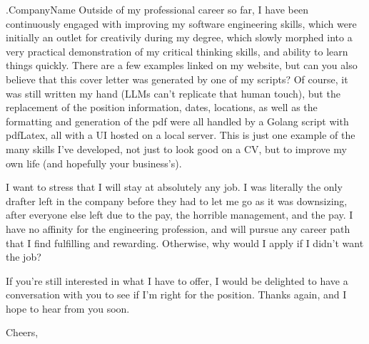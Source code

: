 \documentclass[10pt]{letter}
\begin{document}
\begin{letter}{
    {{ .CompanyName }}
}
Outside of my professional career so far, I have been continuously engaged with improving my software engineering skills, which were initially an outlet for creativily during my degree, which slowly morphed into a very practical demonstration of my critical thinking skills, and ability to learn things quickly. There are a few examples linked on my website, but can you also believe that this cover letter was generated by one of my scripts? Of course, it was still written my hand (LLMs can't replicate that human touch), but the replacement of the position information, dates, locations, as well as the formatting and generation of the pdf were all handled by a Golang script with pdfLatex, all with a UI hosted on a local server. This is just one example of the many skills I've developed, not just to look good on a CV, but to improve my own life (and hopefully your business's). 

I want to stress that I will stay at absolutely any job. I was literally the only drafter left in the company before they had to let me go as it was downsizing, after everyone else left due to the pay, the horrible management, and the pay. I have no affinity for the engineering profession, and will pursue any career path that I find fulfilling and rewarding. Otherwise, why would I apply if I didn't want the job?

If you're still interested in what I have to offer, I would be delighted to have a conversation with you to see if I'm right for the position. Thanks again, and I hope to hear from you soon. 

\closing{Cheers,}

\end{letter}
\end{document}
